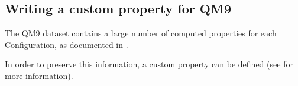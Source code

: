 \documentclass[letterpaper,10pt,english]{sphinxmanual}
\begin{document}
\subsection{Writing a custom property for QM9}
\label{\detokenize{qm9:writing-a-custom-property-for-qm9}}
\sphinxAtStartPar
The QM9 dataset contains a large number of computed properties for each
Configuration, as documented in .

\sphinxAtStartPar
In order to preserve this information, a custom property can be defined
(see {\hyperref[\detokenize{usage:custom-properties}]{}} for more information).
\end{document}
